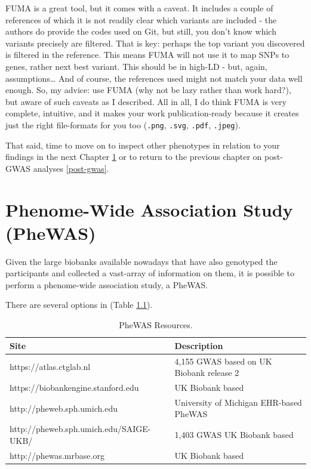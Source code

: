 \documentclass[
]{book}
\newcommand{\passthrough}[1]{#1}
\begin{document}
FUMA is a great tool, but it comes with a caveat. It includes a couple of references of which it is not readily clear which variants are included - the authors do provide the codes used on Git, but still, you don't know which variants precisely are filtered. That is key: perhaps the top variant you discovered is filtered in the reference. This means FUMA will not use it to map SNPs to genes, rather next best variant. This should be in high-LD - but, again, assumptions\ldots{} And of course, the references used might not match your data well enough.
So, my advice: use FUMA (why not be lazy rather than work hard?), but aware of such caveats as I described. All in all, I do think FUMA is very complete, intuitive, and it makes your work publication-ready because it creates just the right file-formats for you too (\passthrough{\lstinline!.png!}, \passthrough{\lstinline!.svg!}, \passthrough{\lstinline!.pdf!}, \passthrough{\lstinline!.jpeg!}).

That said, time to move on to inspect other phenotypes in relation to your findings in the next Chapter \ref{phewas} or to return to the previous chapter on post-GWAS analyses \ref{post-gwas}.

\hypertarget{phewas}{%
\chapter{Phenome-Wide Association Study (PheWAS)}\label{phewas}}

Given the large biobanks available nowadays that have also genotyped the participants and collected a vast-array of information on them, it is possible to perform a phenome-wide association study, a PheWAS.

There are several options in (Table \ref{tab:tab-phewas}).

\begin{table}

\caption{\label{tab:tab-phewas}PheWAS Resources.}
\centering
\begin{tabular}[t]{l|l}
\hline
Site & Description\\
\hline
https://atlas.ctglab.nl & 4,155 GWAS based on UK Biobank release 2\\
\hline
https://biobankengine.stanford.edu & UK Biobank based\\
\hline
http://pheweb.sph.umich.edu & University of Michigan EHR-based PheWAS\\
\hline
http://pheweb.sph.umich.edu/SAIGE-UKB/ & 1,403 GWAS UK Biobank based\\
\hline
http://phewas.mrbase.org & UK Biobank based\\
\hline
\end{tabular}
\end{table}
\end{document}
